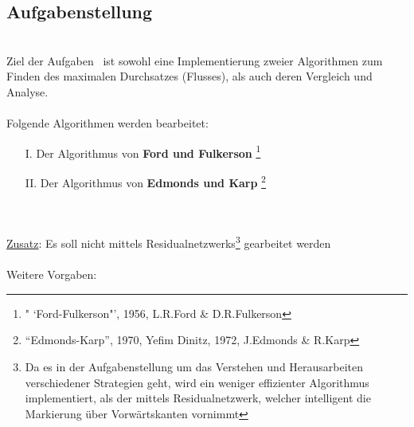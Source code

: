 \documentclass[11pt]{article}
\begin{document}
    \subsection{Aufgabenstellung}\\
    Ziel der Aufgaben~\cite{gkapub} ist sowohl eine Implementierung zweier Algorithmen zum Finden des maximalen Durchsatzes (Flusses), als auch deren Vergleich und Analyse.\\~\\
    Folgende Algorithmen werden bearbeitet:
    \begin{itemize}
        \item[I.] Der Algorithmus von \textbf{Ford und Fulkerson} \footnote[1]{" `Ford-Fulkerson"', 1956, L.R.Ford \& D.R.Fulkerson}
        \item[II.] Der Algorithmus von \textbf{Edmonds und Karp} \footnote[2]{"`Edmonds-Karp"', 1970, Yefim Dinitz, 1972, J.Edmonds \& R.Karp}
    \end{itemize}\\~\\
    \underline{Zusatz}: Es soll nicht mittels Residualnetzwerks\footnote{Da es in der Aufgabenstellung um das Verstehen und Herausarbeiten verschiedener Strategien geht, wird ein weniger effizienter Algorithmus implementiert, als der mittels Residualnetzwerk, welcher intelligent die Markierung \"uber Vorw\"artskanten vornimmt} gearbeitet werden\\~\\
    Weitere Vorgaben:
\end{document}
